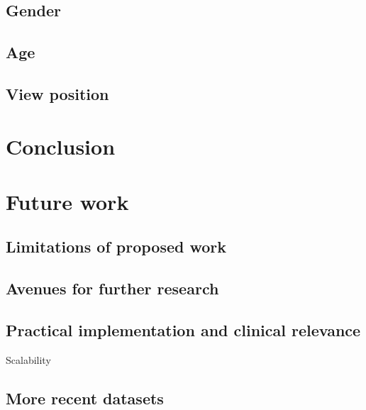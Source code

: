 \documentclass[11pt,twoside,a4paper]{report}
\begin{document}
    \section{Gender}
    \section{Age}
    \section{View position}
\chapter{Conclusion}
\chapter{Future work}
    \section{Limitations of proposed work}
    \section{Avenues for further research}
    \section{Practical implementation and clinical relevance}
    Scalability
    \section{More recent datasets}
\end{document}
